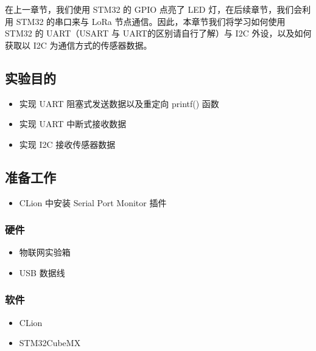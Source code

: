 \documentclass[a4paper,12pt,english]{sphinxmanual}
\begin{document}
\sphinxAtStartPar
在上一章节，我们使用 STM32 的 GPIO 点亮了 LED 灯，在后续章节，我们会利用 STM32 的串口来与 LoRa 节点通信。因此，本章节我们将学习如何使用 STM32 的 UART（USART 与 UART的区别请自行了解）与 I2C 外设，以及如何获取以 I2C 为通信方式的传感器数据。


\subsection{实验目的}
\label{\detokenize{exp-stm32/peripherals-and-sensors:id2}}\begin{itemize}
\item {} 
\sphinxAtStartPar
实现 UART 阻塞式发送数据以及重定向 printf() 函数

\item {} 
\sphinxAtStartPar
实现 UART 中断式接收数据

\item {} 
\sphinxAtStartPar
实现 I2C 接收传感器数据

\end{itemize}


\subsection{准备工作}
\label{\detokenize{exp-stm32/peripherals-and-sensors:id3}}\begin{itemize}
\item {} 
\sphinxAtStartPar
CLion 中安装 Serial Port Monitor 插件

\end{itemize}


\subsubsection{硬件}
\label{\detokenize{exp-stm32/peripherals-and-sensors:id4}}\begin{itemize}
\item {} 
\sphinxAtStartPar
物联网实验箱

\item {} 
\sphinxAtStartPar
USB 数据线

\end{itemize}


\subsubsection{软件}
\label{\detokenize{exp-stm32/peripherals-and-sensors:id5}}\begin{itemize}
\item {} 
\sphinxAtStartPar
CLion

\item {} 
\sphinxAtStartPar
STM32CubeMX

\end{itemize}
\end{document}
